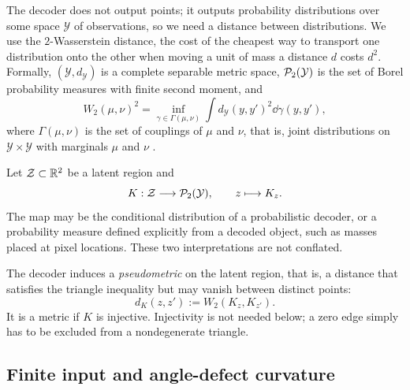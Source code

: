 The decoder does not output points; it outputs probability distributions over
some space $\mathcal Y$ of observations, so we need a distance between
distributions.  We use the $2$-Wasserstein distance, the cost of the cheapest
way to transport one distribution onto the other when moving a unit of mass a
distance $d$ costs $d^2$.  Formally, $(\mathcal Y,d_{\mathcal Y})$ is a
complete separable metric space, $\mathcal{P}_2(\mathcal Y)$ is the set of Borel
probability measures with finite second moment, and
\begin{equation}
 W_2(\mu,\nu)^2
 =\inf_{\gamma\in\Gamma(\mu,\nu)}
 \int d_{\mathcal Y}(y,y')^2\dd\gamma(y,y'),
 \label{eq:w2-definition}
\end{equation}
where $\Gamma(\mu,\nu)$ is the set of couplings of $\mu$ and $\nu$, that is,
joint distributions on $\mathcal Y\times\mathcal Y$ with marginals $\mu$ and
$\nu$ \cite{villani2009,peyre2019}.

Let $\mathcal{Z}\subset\mathbb R^2$ be a latent region and
\begin{equation}
 K:\mathcal{Z}\longrightarrow\mathcal{P}_2(\mathcal Y),\qquad z\longmapsto K_z.
 \label{eq:decoder-measure-map}
\end{equation}
The map may be the conditional distribution of a probabilistic decoder, or a
probability measure defined explicitly from a decoded object, such as masses
placed at pixel locations.  These two interpretations are not conflated.

The decoder induces a \emph{pseudometric} on the latent region, that is, a
distance that satisfies the triangle inequality but may vanish between
distinct points:
\begin{equation}
 d_K(z,z'):=W_2(K_z,K_{z'}).
 \label{eq:decoder-pseudometric}
\end{equation}
It is a metric if $K$ is injective.  Injectivity is not needed below; a zero
edge simply has to be excluded from a nondegenerate triangle.

\subsection{Finite input and angle-defect curvature}
\label{sec:finite-input}


